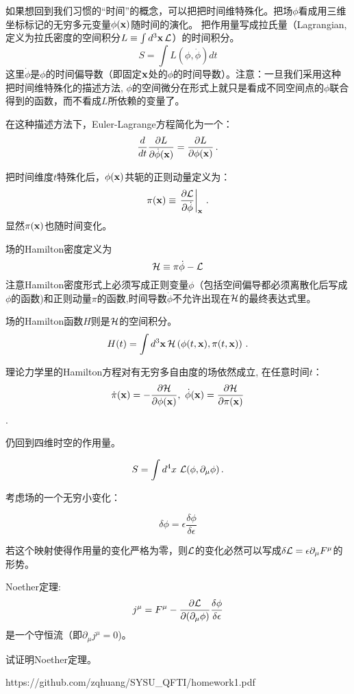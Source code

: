 \documentclass[CJK]{beamer}
\begin{document}
\begin{frame}
\bch
如果想回到我们习惯的“时间”的概念，可以把把时间维特殊化。把场$\phi$看成用三维坐标标记的无穷多元变量$\phi(\mathbf{x})$随时间的演化。
把作用量写成拉氏量（Lagrangian, 定义为拉氏密度的空间积分$L \equiv \int d^3\mathbf{x}\, \mathcal{L}$）的时间积分。
$$S = \int L(\phi,\dot\phi) dt$$
这里$\dot\phi$是$\phi$的时间偏导数（即固定$\mathbf{x}$处的$\phi$的时间导数）。注意：一旦我们采用这种把时间维特殊化的描述方法, $\phi$的空间微分在形式上就只是看成不同空间点的$\phi$联合得到的函数，而不看成$L$所依赖的变量了。

在这种描述方法下，Euler-Lagrange方程简化为一个：
$$\frac{d}{dt} \frac{\partial L}{\partial \dot\phi(\mathbf{x})} = \frac{\partial L}{\partial \phi(\mathbf{x})}\,.$$

\skipline

\ech
\end{frame}


\begin{frame}
\bch
把时间维度$t$特殊化后，$\phi(\mathbf{x})$共轭的正则动量定义为：
$$ \pi(\mathbf{x}) \equiv \left.\frac{\partial\mathcal{L}}{\partial\dot\phi}\right\vert_{\mathbf{x}} \,.$$
显然$\pi(\mathbf{x})$也随时间变化。

场的Hamilton密度定义为
$$ \mathcal{H} \equiv \pi \dot\phi- \mathcal{L} $$
注意Hamilton密度形式上必须写成正则变量$\phi$（包括空间偏导都必须离散化后写成$\phi$的函数)和正则动量$\pi$的函数,时间导数$\dot\phi$不允许出现在$\mathcal{H}$的最终表达式里。

场的Hamilton函数$H$则是$\mathcal{H}$的空间积分。
$$ H(t) = \int d^3\mathbf{x}\, \mathcal{H}\left(\phi(t,\mathbf{x}), \pi(t,\mathbf{x})\right)\,.$$
\ech
\end{frame}

\begin{frame}
\bch
理论力学里的Hamilton方程对有无穷多自由度的场依然成立, 在任意时间$t$：
$$\dot\pi(\mathbf{x}) = -\frac{\partial \mathcal{H}}{\partial\phi(\mathbf{x})},\ \dot\phi(\mathbf{x}) = \frac{\partial\mathcal{H}}{\partial\pi(\mathbf{x})}$$.
\ech
\end{frame}

\begin{frame}
\bch
仍回到四维时空的作用量。

$$S = \int d^4x\ \mathcal{L}(\phi, \partial_\mu\phi)\,.$$

考虑场的一个无穷小变化：

$$\delta \phi = \epsilon \frac{\delta\phi}{\delta\epsilon}$$

若这个映射使得作用量的变化严格为零，则$\mathcal{L}$的变化必然可以写成$ \delta \mathcal{L} = \epsilon \partial_\mu F^\mu$的形势。

Noether定理: $$j^\mu = F^\mu - \frac{\partial\mathcal{L}}{\partial (\partial_\mu\phi)} \frac{\delta\phi}{\delta\epsilon}$$ 是一个守恒流（即$\partial_\mu j^\mu = 0$)。

\ech
\end{frame}

\begin{frame}
\bch
试证明Noether定理。
\ech
\end{frame}

\begin{frame}
\bch
https://github.com/zqhuang/SYSU\_QFTI/homework1.pdf
\ech
\end{frame}
\end{document}
